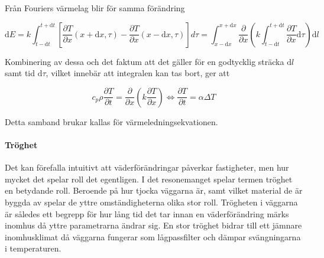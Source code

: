 Från Fouriers värmelag blir för samma förändring

\begin{equation}
\mathrm{d}E = k\int_{t-\mathrm{d}t}^{t+\mathrm{d}t} \left[ \frac{\partial T}{\partial x}\left( x + \mathrm{d}x, \tau \right) - \frac{\partial T}{\partial x}\left( x-\mathrm{d}x, \tau \right)\right]d\tau =  \int_{x-\mathrm{d}x}^{x+\mathrm{d}x} \frac{\partial}{\partial x} \left( k \int_{t-\mathrm{d}t}^{t+\mathrm{d}t} \frac{\partial T}{\partial x} \mathrm{d}\tau \right)\mathrm{d}l
\end{equation}

Kombinering av dessa och det faktum att det gäller för en godtycklig sträcka $\mathrm{d}l$ samt tid $\mathrm{d}\tau$, vilket innebär att integralen kan tas bort, ger att

\begin{equation}\label{eq:conduction:heateq}\boxed{ \; \; \;
c_p \rho \frac{\partial T}{\partial t} = \frac{\partial}{\partial x} \left( k \frac{\partial T}{\partial x} \right) \Leftrightarrow \frac{\partial T}{\partial t} = \alpha \Delta T
\; \; \; }
\end{equation}

Detta samband brukar kallas för värmeledningsekvationen.

\paragraph{Tröghet}
Det kan förefalla intuitivt att väderförändringar påverkar fastigheter, men hur mycket det spelar roll det egentligen. I det resonemanget spelar termen tröghet en betydande roll. Beroende på hur tjocka väggarna är, samt vilket material de är byggda av spelar de yttre omständigheterna olika stor roll. Trögheten i väggarna är således ett begrepp för hur lång tid det tar innan en väderförändring märks inomhus då yttre parametrarna ändrar sig. En stor tröghet bidrar till ett jämnare inomhusklimat då väggarna fungerar som lågpassfilter och dämpar svängningarna i temperaturen.
